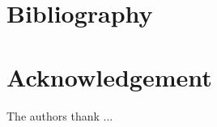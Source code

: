 \documentclass[12pt]{article}
\begin{document}
\section{ Bibliography }
\section*{Acknowledgement}

The authors thank ...





\end{document}
